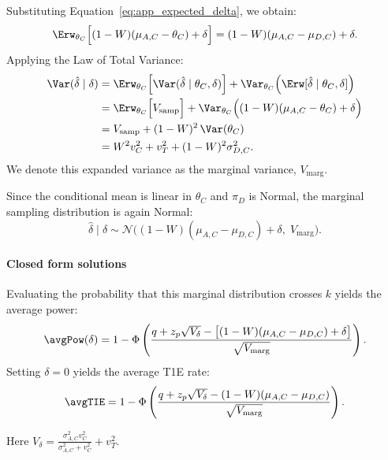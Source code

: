 Substituting Equation~\eqref{eq:app_expected_delta}, we obtain:
\begin{equation} \label{eq:app_marginal_expectation}
    \Erw_{\theta_C} \Big[ (1 - W)(\mu_{A,C} - \theta_C) + \delta \Big] = (1 - W)(\mu_{A,C} - \mu_{D,C}) + \delta. 
\end{equation}
Applying the Law of Total Variance:
\begin{align}
\Var(\hat{\delta} \mid \delta) &= \Erw_{\theta_C} \Big[ \Var(\hat{\delta} \mid \theta_C, \delta) \Big] + \Var_{\theta_C} \Big( \Erw[\hat{\delta} \mid \theta_C, \delta] \Big) \nonumber \\
&= \Erw_{\theta_C} \Big[ V_{\text{samp}} \Big] + \Var_{\theta_C} \Big( (1 - W)(\mu_{A,C} - \theta_C) + \delta \Big) \nonumber \\
&= V_{\text{samp}} + (1 - W)^2 \, \Var(\theta_C) \nonumber \\
&= W^2 v_C^2 + v_T^2 + (1 - W)^2 \sigma_{D,C}^2. \label{eq:app_marginal_variance}
\end{align}
We denote this expanded variance as the marginal variance, $V_{\text{marg}}$.

Since the conditional mean is linear in $\theta_C$ and $\pi_D$ is Normal, the marginal sampling distribution is again Normal:
\begin{equation} \label{eq:app_marginal_distribution}
    \hat{\delta} \mid \delta \sim \mathcal{N}\Big( (1 - W)(\mu_{A,C} - \mu_{D,C}) + \delta, \; V_{\text{marg}} \Big).
\end{equation}

\paragraph{Closed form solutions}
Evaluating the probability that this marginal distribution crosses $k$ yields the average power:
\begin{equation} \label{eq:app_avgpower_closed_form}
    \avgPow(\delta) = 1 - \Phi\left( \frac{q + z_p \sqrt{V_{\delta}} - \big[(1 - W)(\mu_{A,C} - \mu_{D,C}) + \delta\big]}{\sqrt{V_{\text{marg}}}} \right).
\end{equation}
Setting $\delta = 0$ yields the average T1E rate: 
\begin{equation} \label{eq:app_avgt1e_closed_form}
    \avgTIE = 1 - \Phi\left( \frac{q + z_p \sqrt{V_{\delta}} - (1 - W)(\mu_{A,C} - \mu_{D,C})}{\sqrt{V_{\text{marg}}}} \right).
\end{equation}

Here $V_{\delta} = \frac{\sigma_{A,C}^2 v_C^2}{\sigma_{A,C}^2 + v_C^2} + v_T^2$.

